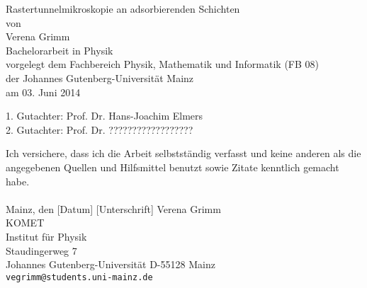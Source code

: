 \documentclass[a4paper,11pt,oneside,final,german,openbib,pdftex]{scrbook}
\begin{document}

\begin{titlepage}
  \vspace*{6mm}
  \begin{center}
     {\afont Rastertunnelmikroskopie an adsorbierenden Schichten}
     \\[3.5cm]
     {\large von}
     \\[3.5cm]
     {\dfont Verena Grimm}
     \\[2cm]
     {\large Bachelorarbeit in Physik \/\\
        vorgelegt dem Fachbereich Physik, Mathematik und Informatik (FB 08) \/\\
        der Johannes Gutenberg-Universit\"at Mainz \/\\
        am 03. Juni 2014}
   \end{center}
   \vfill
   1. Gutachter: Prof. Dr. Hans-Joachim Elmers\\	
   2. Gutachter: Prof. Dr. ?????????????????? \\
   \vfill
\end{titlepage}

\thispagestyle{empty}
Ich versichere, dass ich die Arbeit selbstst\"andig verfasst und keine 
anderen als die angegebenen Quellen und Hilfsmittel benutzt sowie 
Zitate kenntlich gemacht habe.
\\
\\[3.5cm] 
Mainz, den [Datum] [Unterschrift]
\vfill
\noindent 
Verena Grimm\\
KOMET\\
Institut f\"ur Physik\\
Staudingerweg 7\\
Johannes Gutenberg-Universit\"at
D-55128 Mainz\\
{\tt vegrimm@students.uni-mainz.de}

\renewcommand\contentsname{Inhaltsverzeichnis}
\renewcommand\figurename{Abbildung}
\renewcommand\tablename{Tabelle}
\tableofcontents
\clearpage 

\mainmatter  
\sloppy

\end{document}
